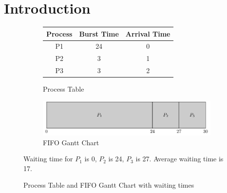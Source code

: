 \documentclass{book/custombook}
\author{Dinal Atapattu}
\begin{document}
\maketitle

\section{Introduction}
\lipsum[1-5]

\begin{figure}[H]
    \centering
    \begin{subfigure}{0.5\textwidth}
        \centering
        \begin{tabular}{ccc}
            Process & Burst Time & Arrival Time\\
            \toprule
            P1 & 24 & 0\\
            P2 & 3  & 1\\
            P3 & 3  & 2\\
            \bottomrule
        \end{tabular}
        \caption{Process Table}
    \end{subfigure}%
    \begin{subfigure}{0.5\textwidth}
        \centering
        \includegraphics[width=\linewidth]{figures/fifo_gantt_1.pdf}
        \caption{FIFO Gantt Chart}
    \end{subfigure}
    Waiting time for $P_1$ is 0, $P_2$ is 24, $P_3$ is 27. Average waiting time is 17.
    \caption{Process Table and FIFO Gantt Chart with waiting times}
\end{figure}
\end{document}
